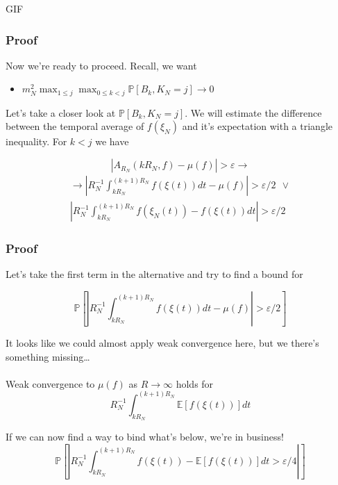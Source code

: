 \documentclass{beamer}
\begin{document}
\begin{frame}
    GIF
\end{frame}

\begin{frame}
    \frametitle{Proof}
    Now we're ready to proceed. Recall, we want

    \begin{itemize}
        \item $m_N^2\max_{1 \leq j}\max_{0 \leq k < j}\mathbb{P}\left[ B_k, K_{N} = j \right] \rightarrow 0$ 
    \end{itemize}

    Let's take a closer look at $\mathbb{P}\left[ B_k, K_{N} = j \right]$. We will estimate the difference between the temporal average of $f(\xi_N)$ and it's expectation with 
    a triangle inequality.
    For $k < j$ we have

    \[
        \left|A_{R_N}(kR_N, f) - \mu(f)\right| > \varepsilon \rightarrow
    \]
    \begin{gather*}
        \rightarrow \left|R_N^{-1}\int_{kR_N}^{(k+1)R_N}f(\xi(t))dt - \mu(f)\right| > \varepsilon/2 \ \ \lor \\
        \left|R_N^{-1}\int_{kR_N}^{(k+1)R_N}f(\xi_N(t)) - f(\xi(t))dt \right| > \varepsilon/2
    \end{gather*}

\end{frame}

\begin{frame}
    \frametitle{Proof}
    Let's take the first term in the alternative and try to find a bound for

    \[
        \mathbb{P}\left[ \left|R_N^{-1}\int_{kR_N}^{(k+1)R_N}f(\xi(t))dt - \mu(f)\right| > \varepsilon/2 \right]
    \]

    It looks like we could almost apply weak convergence here, but we there's something missing\dots \\~\\ 
    Weak convergence to $\mu(f)$ as $R \rightarrow \infty$ holds for
    \[
        R_N^{-1}\int_{kR_N}^{(k+1)R_N}\mathbb{E}\left[ f(\xi(t)) \right]dt
    \]

    If we can now find a way to bind what's below, we're in business!
    \[
        \mathbb{P}\left[\left|R_N^{-1}\int_{kR_N}^{(k+1)R_N}f(\xi(t)) - \mathbb{E}\left[ f(\xi(t)) \right]dt > \varepsilon/4 \right|\right]
    \]
\end{frame}
\end{document}

